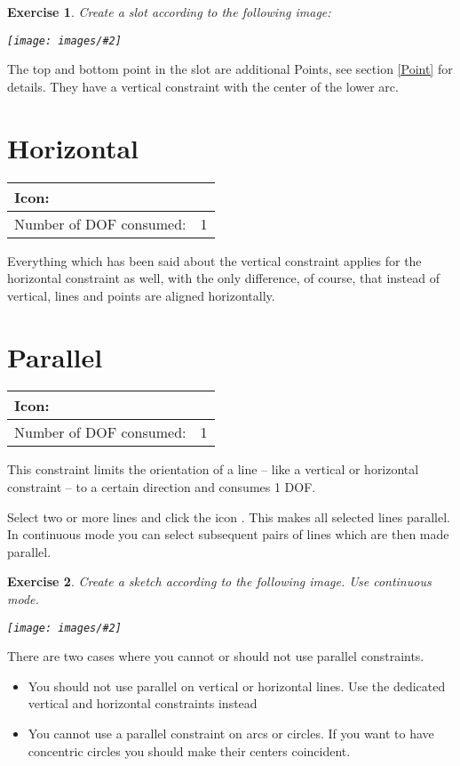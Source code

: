 \documentclass[12pt,titlepage]{article}
\newcommand{\icon}[1]{\raisebox{-1em}{\rule{0pt}{27pt}\texttt{[image: images/\#1]}}}
\newcommand{\img}[2]{\vspace{2ex}\noindent\texttt{[image: images/\#2]}}
\newcommand{\dofConsumed}{Number of DOF consumed:}
\newtheorem{Exercise}{Exercise}
\begin{document}
\begin{Exercise} Create a slot according to the following image:
	
	\img{scale=0.7}{VerticalPoints} \end{Exercise} The top and bottom point in the slot are additional Points, see section \vref{Point} for details. They have a vertical constraint with the center of the lower arc.


\section{Horizontal} \label{Horizontal} \begin{tabular}{|l|l|} \hline Icon: & \icon{Constraint_Horizontal}\\ \hline \dofConsumed & 1 \\ \hline \end{tabular}

Everything which has been said about the vertical constraint applies for the horizontal constraint as well, with the only difference, of course, that instead of vertical, lines and points are aligned horizontally.

\section{Parallel} \begin{tabular}{|l|l|} \hline Icon: & \icon{Constraint_Parallel}\\ \hline \dofConsumed & 1 \\ \hline \end{tabular}

This constraint limits the orientation of a line -- like a vertical or horizontal constraint -- to a certain direction and consumes 1 DOF.

Select two or more lines and click the icon \icon{Constraint_Parallel}. This makes all selected lines parallel. In continuous mode you can select subsequent pairs of lines which are then made parallel.

\begin{Exercise} Create a sketch according to the following image. Use continuous mode.
	
	\img{width=0.6\textwidth}{Parallelogramm} \end{Exercise}

There are two cases where you cannot or should not use parallel constraints. \begin{itemize} \item You should not use parallel on vertical or horizontal lines. Use the dedicated vertical and horizontal constraints instead \item You cannot use a parallel constraint on arcs or circles. If you want to have concentric circles you should make their centers coincident. \end{itemize}
\end{document}
